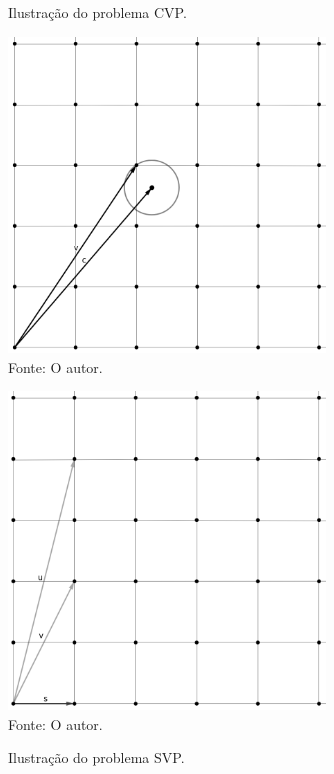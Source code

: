     \begin{figure}[htb!]
        \begin{minipage}[c]{0.5\linewidth}
            \centering
            \caption{Ilustração do problema CVP.}
            \includegraphics[width=0.75\textwidth]{Figuras/cvp.png}\\
            \footnotesize{Fonte: O autor.}
            \label{fig:cvp}
        \end{minipage}\hfill
        \begin{minipage}[c]{0.5\linewidth}
            \centering
            \caption{Ilustração do problema SVP.}
            \includegraphics[width=0.75\textwidth]{Figuras/svp.png}\\
            \footnotesize{Fonte: O autor.}
            \label{fig:svp}
        \end{minipage}
    \end{figure}
    
